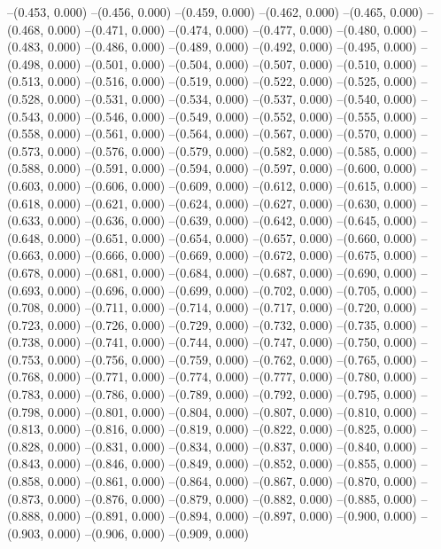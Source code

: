 {--(0.453, 0.000)
--(0.456, 0.000)
--(0.459, 0.000)
--(0.462, 0.000)
--(0.465, 0.000)
--(0.468, 0.000)
--(0.471, 0.000)
--(0.474, 0.000)
--(0.477, 0.000)
--(0.480, 0.000)
--(0.483, 0.000)
--(0.486, 0.000)
--(0.489, 0.000)
--(0.492, 0.000)
--(0.495, 0.000)
--(0.498, 0.000)
--(0.501, 0.000)
--(0.504, 0.000)
--(0.507, 0.000)
--(0.510, 0.000)
--(0.513, 0.000)
--(0.516, 0.000)
--(0.519, 0.000)
--(0.522, 0.000)
--(0.525, 0.000)
--(0.528, 0.000)
--(0.531, 0.000)
--(0.534, 0.000)
--(0.537, 0.000)
--(0.540, 0.000)
--(0.543, 0.000)
--(0.546, 0.000)
--(0.549, 0.000)
--(0.552, 0.000)
--(0.555, 0.000)
--(0.558, 0.000)
--(0.561, 0.000)
--(0.564, 0.000)
--(0.567, 0.000)
--(0.570, 0.000)
--(0.573, 0.000)
--(0.576, 0.000)
--(0.579, 0.000)
--(0.582, 0.000)
--(0.585, 0.000)
--(0.588, 0.000)
--(0.591, 0.000)
--(0.594, 0.000)
--(0.597, 0.000)
--(0.600, 0.000)
--(0.603, 0.000)
--(0.606, 0.000)
--(0.609, 0.000)
--(0.612, 0.000)
--(0.615, 0.000)
--(0.618, 0.000)
--(0.621, 0.000)
--(0.624, 0.000)
--(0.627, 0.000)
--(0.630, 0.000)
--(0.633, 0.000)
--(0.636, 0.000)
--(0.639, 0.000)
--(0.642, 0.000)
--(0.645, 0.000)
--(0.648, 0.000)
--(0.651, 0.000)
--(0.654, 0.000)
--(0.657, 0.000)
--(0.660, 0.000)
--(0.663, 0.000)
--(0.666, 0.000)
--(0.669, 0.000)
--(0.672, 0.000)
--(0.675, 0.000)
--(0.678, 0.000)
--(0.681, 0.000)
--(0.684, 0.000)
--(0.687, 0.000)
--(0.690, 0.000)
--(0.693, 0.000)
--(0.696, 0.000)
--(0.699, 0.000)
--(0.702, 0.000)
--(0.705, 0.000)
--(0.708, 0.000)
--(0.711, 0.000)
--(0.714, 0.000)
--(0.717, 0.000)
--(0.720, 0.000)
--(0.723, 0.000)
--(0.726, 0.000)
--(0.729, 0.000)
--(0.732, 0.000)
--(0.735, 0.000)
--(0.738, 0.000)
--(0.741, 0.000)
--(0.744, 0.000)
--(0.747, 0.000)
--(0.750, 0.000)
--(0.753, 0.000)
--(0.756, 0.000)
--(0.759, 0.000)
--(0.762, 0.000)
--(0.765, 0.000)
--(0.768, 0.000)
--(0.771, 0.000)
--(0.774, 0.000)
--(0.777, 0.000)
--(0.780, 0.000)
--(0.783, 0.000)
--(0.786, 0.000)
--(0.789, 0.000)
--(0.792, 0.000)
--(0.795, 0.000)
--(0.798, 0.000)
--(0.801, 0.000)
--(0.804, 0.000)
--(0.807, 0.000)
--(0.810, 0.000)
--(0.813, 0.000)
--(0.816, 0.000)
--(0.819, 0.000)
--(0.822, 0.000)
--(0.825, 0.000)
--(0.828, 0.000)
--(0.831, 0.000)
--(0.834, 0.000)
--(0.837, 0.000)
--(0.840, 0.000)
--(0.843, 0.000)
--(0.846, 0.000)
--(0.849, 0.000)
--(0.852, 0.000)
--(0.855, 0.000)
--(0.858, 0.000)
--(0.861, 0.000)
--(0.864, 0.000)
--(0.867, 0.000)
--(0.870, 0.000)
--(0.873, 0.000)
--(0.876, 0.000)
--(0.879, 0.000)
--(0.882, 0.000)
--(0.885, 0.000)
--(0.888, 0.000)
--(0.891, 0.000)
--(0.894, 0.000)
--(0.897, 0.000)
--(0.900, 0.000)
--(0.903, 0.000)
--(0.906, 0.000)
--(0.909, 0.000)
}
